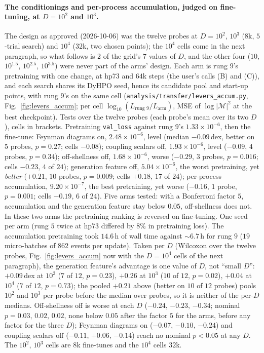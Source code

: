 \documentclass[11pt]{article}
\newcommand{\code}[1]{\texttt{#1}}
\begin{document}
\paragraph{The conditionings and per-process accumulation, judged on fine-tuning, at $D=10^2$ and $10^3$.} The design
as approved (2026-10-06) was the twelve probes at $D=10^2$, $10^3$ ($8$k, $5$-trial search) and $10^4$ ($32$k, two chosen
points); the $10^4$ cells come in the next paragraph, so what follows is $2$ of the grid's $7$ values of $D$, and the
other four ($10$, $10^{1.5}$, $10^{2.5}$, $10^{3.5}$) were never part of the arms' design. Each arm is rung $9$'s
pretraining with one change, at hp73 and $64$k steps (the user's calls (B) and (C)), and each search shares its DyHPO
seed, hence its candidate pool and start-up points, with rung $9$'s on the same cell
(\code{analysis/transfer/levers\_accum.py}, Fig.~\ref{fig:levers_accum}; per cell $\log_{10}(L_\text{rung 9}/L_\text{arm})$,
MSE of $\log|\mathcal M|^2$ at the best checkpoint). Tests over the twelve probes (each probe's mean over its two $D$),
cells in brackets. Pretraining \code{val\_loss} against rung $9$'s $1.33\times10^{-6}$, then the fine-tune: Feynman
diagrams on, $2.48\times10^{-6}$, level (median $-0.09$\,dex, better on $5$ probes, $p=0.27$; cells $-0.08$); coupling
scalars off, $1.93\times10^{-6}$, level ($-0.09$, $4$ probes, $p=0.34$); off-shellness off, $1.68\times10^{-6}$, worse
($-0.29$, $3$ probes, $p=0.016$; cells $-0.23$, $4$ of $24$); generation feature off, $5.04\times10^{-6}$, the worst
pretraining, yet \emph{better} ($+0.21$, $10$ probes, $p=0.009$; cells $+0.18$, $17$ of $24$); per-process accumulation,
$9.20\times10^{-7}$, the best pretraining, yet worse ($-0.16$, $1$ probe, $p=0.001$; cells $-0.19$, $6$ of $24$). Five
arms tested: with a Bonferroni factor $5$, accumulation and the generation feature stay below $0.05$, off-shellness does
not. In these two arms the pretraining ranking is reversed on fine-tuning. One seed per arm (rung $5$ twice at hp73
differed by $8\%$ in pretraining loss). The accumulation pretraining took $14.6$\,h of wall time against $\sim6.7$\,h for
rung $9$ ($19$ micro-batches of $862$ events per update). Taken per $D$ (Wilcoxon over the twelve probes, Fig.~\ref{fig:levers_accum} now with the $D=10^4$ cells of the
next paragraph), the generation feature's advantage is one value of $D$, not ``small $D$'': $+0.09$\,dex at $10^2$ ($7$ of
$12$, $p=0.23$), $+0.26$ at $10^3$ ($10$ of $12$, $p=0.02$), $+0.04$ at $10^4$ ($7$ of $12$, $p=0.73$); the pooled
$+0.21$ above (better on $10$ of $12$ probes) pools $10^2$ and $10^3$ per probe before the median over probes, so it is
neither of the per-$D$ medians. Off-shellness off is worse at each $D$ ($-0.24$, $-0.23$, $-0.34$; nominal $p=0.03$, $0.02$, $0.02$,
none below $0.05$ after the factor $5$ for the arms, before any factor for the three $D$); Feynman diagrams on ($-0.07$,
$-0.10$, $-0.24$) and coupling scalars off ($-0.11$, $+0.06$, $-0.14$) reach no nominal $p<0.05$ at any $D$. The
$10^2$, $10^3$ cells are $8$k fine-tunes and the $10^4$ cells $32$k.
\end{document}
